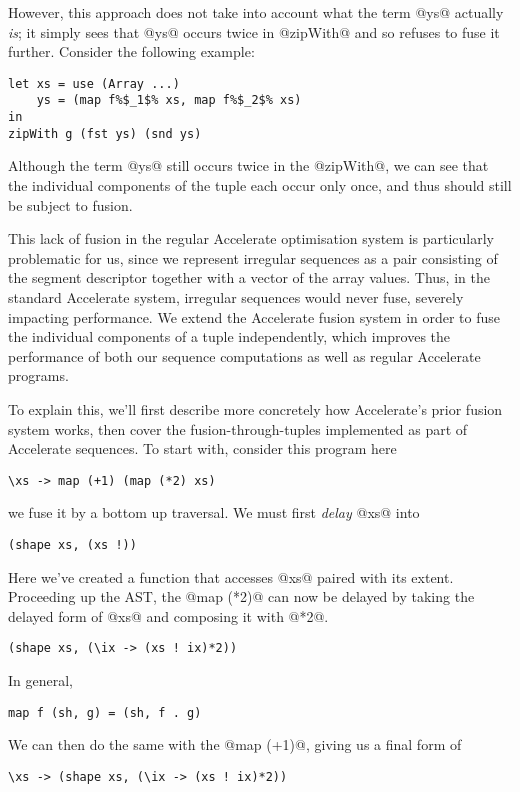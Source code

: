 However, this approach does not take into account what the term @ys@ actually
\emph{is}; it simply sees that @ys@ occurs twice in @zipWith@ and so refuses to
fuse it further. Consider the following example:
%
\begin{lstlisting}
let xs = use (Array ...)
    ys = (map f%$_1$% xs, map f%$_2$% xs)
in
zipWith g (fst ys) (snd ys)
\end{lstlisting}
%
Although the term @ys@ still occurs twice in the @zipWith@, we can see that the
individual components of the tuple each occur only once, and thus should still
be subject to fusion.

This lack of fusion in the regular Accelerate optimisation system is
particularly problematic for us, since we represent irregular sequences as a
pair consisting of the segment descriptor together with a vector of the array
values. Thus, in the standard Accelerate system, irregular sequences would never
fuse, severely impacting performance. We extend the Accelerate fusion system in
order to fuse the individual components of a tuple independently, which improves
the performance of both our sequence computations as well as regular Accelerate
programs.

To explain this, we'll first describe more concretely how Accelerate's prior fusion system works, then cover the fusion-through-tuples implemented as part of Accelerate sequences. To start with, consider this program here
%
\begin{lstlisting}
\xs -> map (+1) (map (*2) xs)
\end{lstlisting}
%
we fuse it by a bottom up traversal. We must first \emph{delay} @xs@ into
%
\begin{lstlisting}
(shape xs, (xs !))
\end{lstlisting}
%
Here we've created a function that accesses @xs@ paired with its extent. Proceeding up the AST, the @map (*2)@ can now be delayed by taking the delayed form of @xs@ and composing it with @*2@.
%
\begin{lstlisting}
(shape xs, (\ix -> (xs ! ix)*2))
\end{lstlisting}
%
In general,
%
\begin{lstlisting}
map f (sh, g) = (sh, f . g)
\end{lstlisting}
%
We can then do the same with the @map (+1)@, giving us a final form of
%
\begin{lstlisting}
\xs -> (shape xs, (\ix -> (xs ! ix)*2))
\end{lstlisting}

